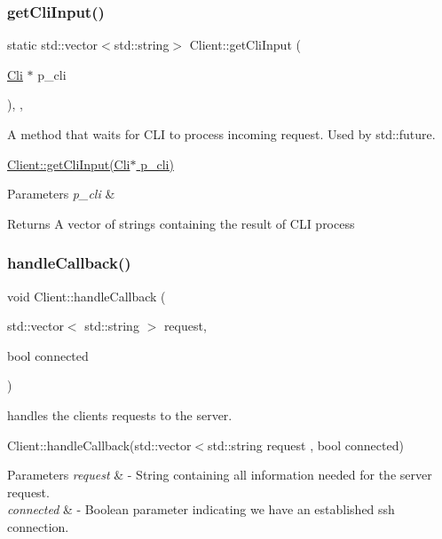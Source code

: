 \subsubsection{\texorpdfstring{get\+Cli\+Input()}{getCliInput()}}
{\footnotesize\ttfamily static std\+::vector$<$std\+::string$>$ Client\+::get\+Cli\+Input (\begin{DoxyParamCaption}\item[{\hyperlink{classCli}{Cli} $\ast$}]{p\+\_\+cli }\end{DoxyParamCaption})\hspace{0.3cm}{\ttfamily [inline]}, {\ttfamily [static]}, {\ttfamily [private]}}



A method that waits for C\+LI to process incoming request. Used by std\+::future. 

\hyperlink{classClient_a62807c316030505b03b90186d3b06a25}{Client\+::get\+Cli\+Input(\+Cli$\ast$ p\+\_\+cli)} 
\begin{DoxyParams}{Parameters}
{\em p\+\_\+cli} & \\
\hline
\end{DoxyParams}
\begin{DoxyReturn}{Returns}
A vector of strings containing the result of C\+LI process 
\end{DoxyReturn}
\mbox{\label{classClient_a12334d98c376fbdf577d1dfa6bf9a4c0}} 
\subsubsection{\texorpdfstring{handle\+Callback()}{handleCallback()}}
{\footnotesize\ttfamily void Client\+::handle\+Callback (\begin{DoxyParamCaption}\item[{std\+::vector$<$ std\+::string $>$}]{request,  }\item[{bool}]{connected }\end{DoxyParamCaption})\hspace{0.3cm}{\ttfamily [private]}}



handles the clients requests to the server. 

Client\+::handle\+Callback(std\+::vector$<$std\+::string request , bool connected) 
\begin{DoxyParams}{Parameters}
{\em request} & -\/ String containing all information needed for the server request. \\
\hline
{\em connected} & -\/ Boolean parameter indicating we have an established ssh connection. \\
\hline
\end{DoxyParams}
\mbox{\label{classClient_a33b0b1f7391689c68fa125549e8c5dcc}} 
